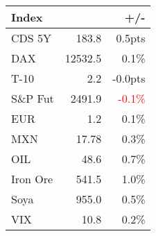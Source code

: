 \documentclass[article,crop=false]{standalone}%
\begin{document}
%
\scriptsize%
\renewcommand{\arraystretch}{1.2}%
\setlength{\tabcolsep}{0.15cm}%
\begin{tabular}{l  r  r  }%
\hline%
\textbf{Index}&\textbf{}&\textbf{+/{-}}\\%
\hline%
CDS 5Y&183.8&0.5pts\\%
DAX&12532.5&0.1\%\\%
T{-}10&2.2&{-}0.0pts\\%
S\&P Fut&2491.9&\textcolor{red}{ 
{-}0.1\%
}\\%
EUR&1.2&0.1\%\\%
MXN&17.78&0.3\%\\%
OIL&48.6&0.7\%\\%
Iron Ore&541.5&1.0\%\\%
Soya&955.0&0.5\%\\%
VIX&10.8&0.2\%\\%
\hline%
\end{tabular}%
\end{document}
